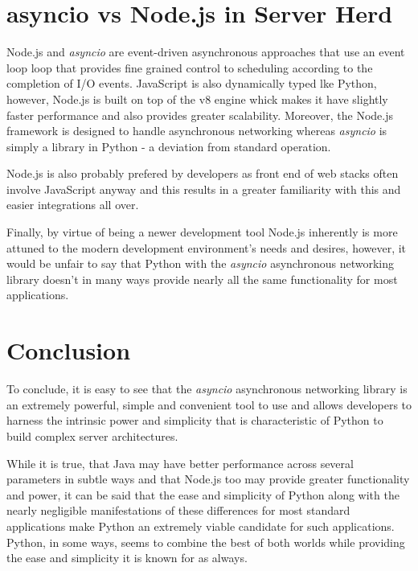 \section{asyncio vs Node.js in Server Herd}
Node.js and \emph{asyncio} are event-driven asynchronous approaches that use an event loop loop that provides fine grained control to scheduling according to the completion of I/O events. JavaScript is also dynamically typed lke Python, however, Node.js is built on top of the v8 engine whick makes it have slightly faster performance and also provides greater scalability. Moreover, the Node.js framework is designed to handle asynchronous networking whereas \emph{asyncio} is simply a library in Python - a deviation from standard operation. \newline

\noindent Node.js is also probably prefered by developers as front end of web stacks often involve JavaScript anyway and this results in a greater familiarity with this and easier integrations all over. 

\noindent Finally, by virtue of being a newer development tool Node.js inherently is more attuned to the modern development environment's needs and desires, however, it would be unfair to say that Python with the \emph{asyncio} asynchronous networking library doesn't in many ways provide nearly all the same functionality for most applications. 

\section{Conclusion}

To conclude, it is easy to see that the \emph{asyncio} asynchronous networking library is an extremely powerful, simple and convenient tool to use and allows developers to harness the intrinsic power and simplicity that is characteristic of Python to build complex server architectures. \newline

\noindent While it is true, that Java may have better performance across several parameters in subtle ways and that Node.js too may provide greater functionality and power, it can be said that the ease and simplicity of Python along with the nearly negligible manifestations of these differences for most standard applications make Python an extremely viable candidate for such applications. Python, in some ways, seems to combine the best of both worlds while providing the ease and simplicity it is known for as always. 


